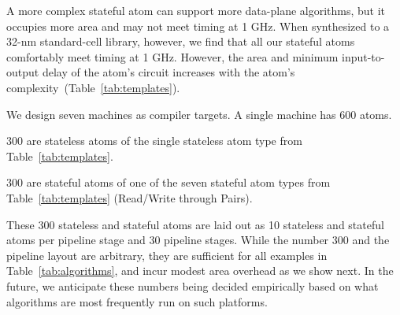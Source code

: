 A more complex stateful atom can support more data-plane algorithms, but it
occupies more area and may not meet timing at 1 GHz.  When synthesized to a
32-nm standard-cell library, however, we find that all our stateful atoms
comfortably meet timing at 1 GHz.  However, the area and minimum
input-to-output delay of the atom's circuit increases with the atom's
complexity~(Table~\ref{tab:templates}).

We design seven \absmachine machines as compiler targets. A single \absmachine
machine has 600 atoms.
\begin{CompactEnumerate}
\item 300 are stateless atoms of the single stateless atom type from
Table~\ref{tab:templates}.
\item 300 are stateful atoms of one of the seven stateful atom types from
Table~\ref{tab:templates} (Read/Write through Pairs).
\end{CompactEnumerate}
These 300 stateless and stateful atoms are laid out as 10 stateless and
stateful atoms per pipeline stage and 30 pipeline stages. While the number 300
and the pipeline layout are arbitrary, they are sufficient for all examples in
Table~\ref{tab:algorithms}, and incur modest area overhead as we show next. In
the future, we anticipate these numbers being decided empirically based on what
algorithms are most frequently run on such platforms.

